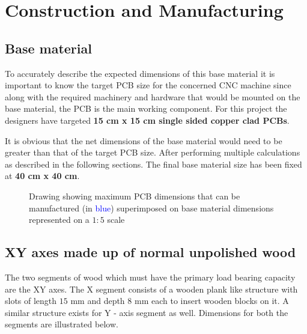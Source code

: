 \chapter{Construction and Manufacturing} \label{chapter3}

\section{Base material} \label{bmaterial}

To accurately describe the expected dimensions of this base material it is important to know the target PCB size for the concerned CNC machine since along with the required machinery and hardware that would be mounted on the base material, the PCB is the main working component. For this project the designers have targeted \textbf{15 cm x 15 cm single sided copper clad PCBs}. \par

It is obvious that the net dimensions of the base material would need to be greater than that of the target PCB size. After performing multiple calculations as described in the following sections. The final base material size has been fixed at \textbf{40 cm x 40 cm}.

\begin{figure}[h]
    \centering
    \caption{Drawing showing maximum PCB dimensions that can be manufactured (in \textcolor{blue}{blue}) superimposed on base material dimensions represented on a $1:5$ scale}
    \label{fig:base}
\end{figure}


\section{XY axes made up of normal unpolished wood}

The two segments of wood which must have the primary load bearing capacity are the XY axes. The X segment consists of a wooden plank like structure with slots of length $15$ mm and depth $8$ mm each to insert wooden blocks on it. A similar structure exists for Y - axis segment as well. Dimensions for both the segments are illustrated below. \par 

